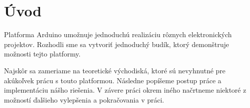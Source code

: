 \chapter*{Úvod}
Platforma Arduino umožnuje jednoduchú realizáciu rôznych elektronických projektov. Rozhodli sme sa vytvoriť jednoduchý budík, ktorý demonštruje možnosti tejto platformy.

Najskôr sa zameriame na teoretické východiská, ktoré sú nevyhnutné pre akúkoľvek prácu s touto platformou. Následne popíšeme postup práce a implementáciu nášho riešenia. V závere práci okrem iného načrtneme niektoré z možností ďalšieho vylepšenia a pokračovania v práci.

\newpage
